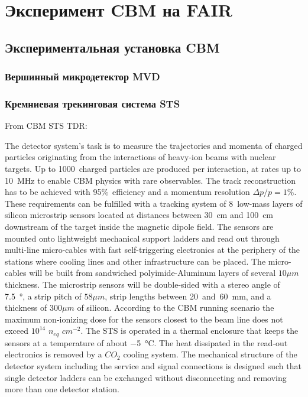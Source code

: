 \chapter{Эксперимент CBM на FAIR}\label{sec:secCbm}

\section{Экспериментальная установка CBM}\label{sec:secCbmSetup}

\subsection{Вершинный микродетектор MVD}\label{sec:secMVD}

\subsection{Кремниевая трекинговая система STS}\label{sec:secSTS}

From CBM STS TDR:

The detector system’s task is to measure the trajectories and momenta of charged particles originating from the interactions of heavy-ion beams with nuclear targets. Up to 1000~charged particles are produced per interaction, at rates up to 10~MHz to enable CBM physics with rare observables. The track reconstruction has to be achieved with 95\%~efficiency and a momentum resolution $\Delta p / p = 1\%$. These requirements can be fulfilled with a tracking system of 8~low-mass layers of silicon microstrip sensors located at distances between 30~cm and 100~cm downstream of the target inside the magnetic dipole field. The sensors are mounted onto lightweight mechanical support ladders and read out through multi-line micro-cables with fast self-triggering electronics at the periphery of the stations where cooling lines and other infrastructure can be placed. The micro-cables will be built from sandwiched polyimide-Aluminum layers of several $10 \mu m$ thickness. The microstrip sensors will be double-sided with a stereo angle of \SI{7.5}{\degree}, a strip pitch of $58 \mu m$, strip lengths between 20~and~60~mm, and a thickness of $300 \mu m$ of silicon. According to the CBM running scenario the maximum non-ionizing dose for the sensors closest to the beam line does not exceed $10^{14}$ $n_{eq}$ $cm^{-2}$. The STS is operated in a thermal enclosure that keeps the sensors at a temperature of about \SI{-5}{\degreeCelsius}. The heat dissipated in the read-out electronics is removed by a $CO_{2}$ cooling system. The mechanical structure of the detector system including the service and signal connections is designed such that single detector ladders can be exchanged without disconnecting and removing more than one detector station.

